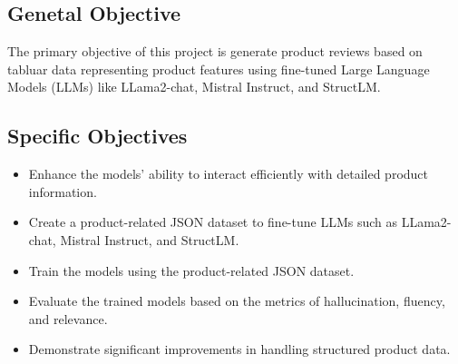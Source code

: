 \subsection{Genetal Objective}
The primary objective of this project is generate product reviews based on tabluar data representing product features using fine-tuned Large Language Models (LLMs) like LLama2-chat, Mistral Instruct, and StructLM.
\subsection{Specific Objectives}
\begin{itemize}
    \item Enhance the models' ability to interact efficiently with detailed product information.
    \item Create a product-related JSON dataset to fine-tune LLMs such as LLama2-chat, Mistral Instruct, and StructLM.
    \item Train the models using the product-related JSON dataset.
    \item Evaluate the trained models based on the metrics of hallucination, fluency, and relevance.
    \item Demonstrate significant improvements in handling structured product data.
\end{itemize}